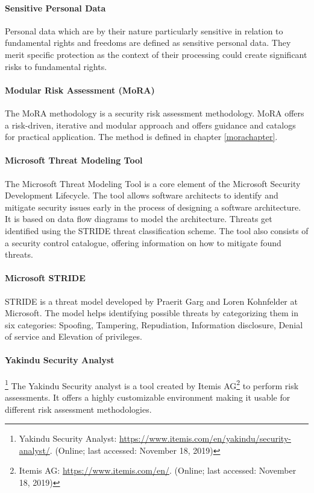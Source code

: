 \paragraph{\textbf{Sensitive Personal Data}} Personal data which are by their nature particularly sensitive in relation to fundamental rights and freedoms are defined as sensitive personal data\cite{GDPR9}. They merit specific protection as the context of their processing could create significant risks to fundamental rights.

\paragraph{\textbf{Modular Risk Assessment (MoRA)}} The MoRA methodology is a security risk assessment methodology\cite{mora}. MoRA offers a risk-driven, iterative and modular approach and offers guidance and catalogs for practical application. The method is defined in chapter \ref{morachapter}.

\paragraph{Microsoft Threat Modeling Tool}\cite{mtmt} The Microsoft Threat Modeling Tool is a core element of the Microsoft Security Development Lifecycle. The tool allows software architects to identify and mitigate security issues early in the process of designing a software architecture. 
It is based on data flow diagrams to model the architecture. Threats get identified using the STRIDE threat classification scheme. The tool also consists of a security control catalogue, offering information on how to mitigate found threats.

\paragraph{Microsoft STRIDE} STRIDE is a threat model developed by Praerit Garg and Loren Kohnfelder at Microsoft\cite{stride}. The model helps identifying possible threats by categorizing them in six categories: Spoofing, Tampering, Repudiation, Information disclosure, Denial of service and Elevation of privileges.

\paragraph{Yakindu Security Analyst}\footnote{Yakindu Security Analyst: \url{https://www.itemis.com/en/yakindu/security-analyst/}. (Online; last accessed:  November 18, 2019)} The Yakindu Security analyst is a tool created by Itemis AG\footnote{Itemis AG: \url{https://www.itemis.com/en/}. (Online; last accessed:  November 18, 2019)} to perform risk assessments. It offers a highly customizable environment making it usable for different risk assessment methodologies. 


